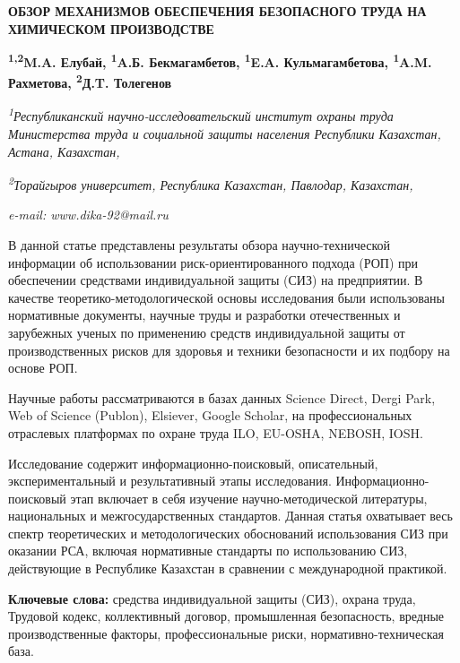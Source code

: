 \begin{articleheader}
{\bfseries ОБЗОР МЕХАНИЗМОВ ОБЕСПЕЧЕНИЯ БЕЗОПАСНОГО ТРУДА НА ХИМИЧЕСКОМ ПРОИЗВОДСТВЕ}

{\bfseries
\textsuperscript{1,2}M.A. Елубай,
\textsuperscript{1}A.Б. Бекмагамбетов,
\textsuperscript{1}E.A. Кульмагамбетова,
\textsuperscript{1}A.M. Рахметова,
\textsuperscript{2}Д.T. Толегенов\textsuperscript{\envelope }}
\end{articleheader}

\begin{affiliation}
\emph{\textsuperscript{1}Республиканский научно-исследовательский
институт охраны труда Министерства труда и социальной защиты населения
Республики Казахстан, Астана, Казахстан,}

\emph{\textsuperscript{2}Торайгыров университет, Республика Казахстан, Павлодар, Казахстан,}

\emph{e-mail: www.dika-92@mail.ru}
\end{affiliation}

В данной статье представлены результаты обзора научно-технической
информации об использовании риск-ориентированного подхода (РОП) при
обеспечении средствами индивидуальной защиты (СИЗ) на предприятии. В
качестве теоретико-методологической основы исследования были
использованы нормативные документы, научные труды и разработки
отечественных и зарубежных ученых по применению средств индивидуальной
защиты от производственных рисков для здоровья и техники безопасности и
их подбору на основе РОП.

Научные работы рассматриваются в базах данных Science Direct, Dergi
Park, Web of Science (Publon), Elsiever, Google Scholar, на
профессиональных отраслевых платформах по охране труда ILO, EU-OSHA,
NEBOSH, IOSH.

Исследование содержит информационно-поисковый, описательный,
экспериментальный и результативный этапы исследования.
Информационно-поисковый этап включает в себя изучение
научно-методической литературы, национальных и межгосударственных
стандартов. Данная статья охватывает весь спектр теоретических и
методологических обоснований использования СИЗ при оказании РСА, включая
нормативные стандарты по использованию СИЗ, действующие в Республике
Казахстан в сравнении с международной практикой.

{\bfseries Ключевые слова:} средства индивидуальной защиты (СИЗ), охрана
труда, Трудовой кодекс, коллективный договор, промышленная безопасность,
вредные производственные факторы, профессиональные риски,
нормативно-техническая база.

